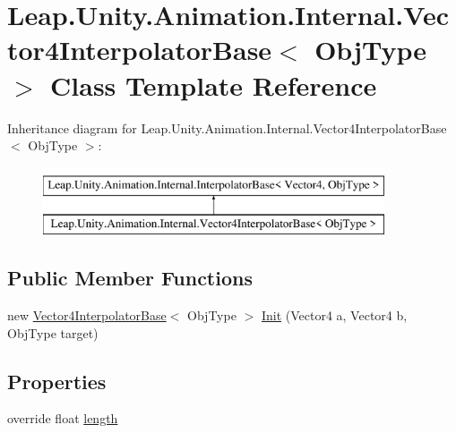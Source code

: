 \hypertarget{class_leap_1_1_unity_1_1_animation_1_1_internal_1_1_vector4_interpolator_base}{}\section{Leap.\+Unity.\+Animation.\+Internal.\+Vector4\+Interpolator\+Base$<$ Obj\+Type $>$ Class Template Reference}
\label{class_leap_1_1_unity_1_1_animation_1_1_internal_1_1_vector4_interpolator_base}
Inheritance diagram for Leap.\+Unity.\+Animation.\+Internal.\+Vector4\+Interpolator\+Base$<$ Obj\+Type $>$\+:\begin{figure}[H]
\begin{center}
\leavevmode
\includegraphics[height=2.000000cm]{class_leap_1_1_unity_1_1_animation_1_1_internal_1_1_vector4_interpolator_base}
\end{center}
\end{figure}
\subsection*{Public Member Functions}
\begin{DoxyCompactItemize}
\item 
new \mbox{\hyperlink{class_leap_1_1_unity_1_1_animation_1_1_internal_1_1_vector4_interpolator_base}{Vector4\+Interpolator\+Base}}$<$ Obj\+Type $>$ \mbox{\hyperlink{class_leap_1_1_unity_1_1_animation_1_1_internal_1_1_vector4_interpolator_base_a64a5b7edddebfbdb789246f2a8116d3a}{Init}} (Vector4 a, Vector4 b, Obj\+Type target)
\end{DoxyCompactItemize}
\subsection*{Properties}
\begin{DoxyCompactItemize}
\item 
override float \mbox{\hyperlink{class_leap_1_1_unity_1_1_animation_1_1_internal_1_1_vector4_interpolator_base_ae40919d21f2e4fa72d4a7d79ff261fbc}{length}}
\end{DoxyCompactItemize}
